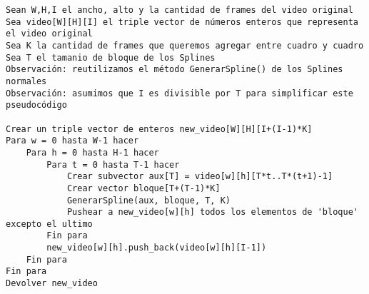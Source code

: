 \begin{lstlisting}
Sean W,H,I el ancho, alto y la cantidad de frames del video original
Sea video[W][H][I] el triple vector de números enteros que representa el video original
Sea K la cantidad de frames que queremos agregar entre cuadro y cuadro
Sea T el tamanio de bloque de los Splines
Observación: reutilizamos el método GenerarSpline() de los Splines normales
Observación: asumimos que I es divisible por T para simplificar este pseudocódigo

Crear un triple vector de enteros new_video[W][H][I+(I-1)*K]
Para w = 0 hasta W-1 hacer
	Para h = 0 hasta H-1 hacer
		Para t = 0 hasta T-1 hacer
			Crear subvector aux[T] = video[w][h][T*t..T*(t+1)-1]
			Crear vector bloque[T+(T-1)*K]
			GenerarSpline(aux, bloque, T, K)
			Pushear a new_video[w][h] todos los elementos de 'bloque' excepto el ultimo
		Fin para
		new_video[w][h].push_back(video[w][h][I-1])
	Fin para
Fin para
Devolver new_video
\end{lstlisting}
